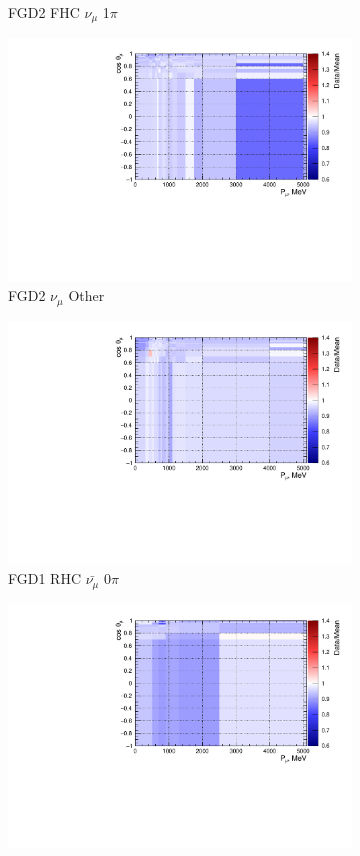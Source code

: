 \begin{figure}
\begin{subfigure}{.32\textwidth}
  \caption{FGD2 FHC $\nu_{\mu}$ 1$\pi$}
  \label{fig:priorpred_FGD2_numuCC_1pi}
\end{subfigure}
\begin{subfigure}{.32\textwidth}
  \centering
  \includegraphics[width=0.85\linewidth]{figs/priorpred_FGD2_numuCC_other.pdf}
  \caption{FGD2 $\nu_{\mu}$ Other}
  \label{fig:priorpred_FGD2_numuCC_other}
\end{subfigure}
\centering
\begin{subfigure}{.32\textwidth}
  \centering
  \includegraphics[width=0.85\linewidth]{figs/priorpred_FGD1_anti-numuCC_0pi.pdf}
  \caption{FGD1 RHC $\bar{\nu_{\mu}}$ 0$\pi$}
  \label{fig:priorpred_FGD1_anti-numuCC_0pi}
\end{subfigure}
\begin{subfigure}{.32\textwidth}
  \centering
  \includegraphics[width=0.85\linewidth]{figs/priorpred_FGD1_anti-numuCC_1pi.pdf}

\end{subfigure}
\end{figure}
